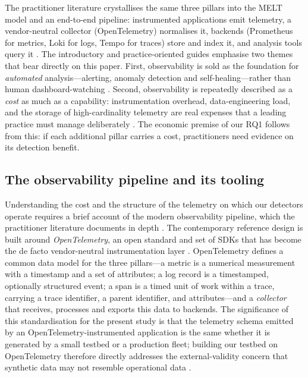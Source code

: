 \documentclass[acmsmall]{acmart}
\begin{document}
The practitioner literature crystallises the same three pillars into the MELT model and an end-to-end pipeline: instrumented applications emit telemetry, a vendor-neutral collector (OpenTelemetry) normalises it, backends (Prometheus for metrics, Loki for logs, Tempo for traces) store and index it, and analysis tools query it \cite{boten2022,chapman2023}. The introductory and practice-oriented guides emphasise two themes that bear directly on this paper. First, observability is sold as the foundation for \emph{automated} analysis---alerting, anomaly detection and self-healing---rather than human dashboard-watching \cite{beginnersobs,aws2022obs}. Second, observability is repeatedly described as a \emph{cost} as much as a capability: instrumentation overhead, data-engineering load, and the storage of high-cardinality telemetry are real expenses that a leading practice must manage deliberately \cite{leadingobs,kosinska2023}. The economic premise of our RQ1 follows from this: if each additional pillar carries a cost, practitioners need evidence on its detection benefit.

\subsection{The observability pipeline and its tooling}\label{sec:bg-tooling}

Understanding the cost and the structure of the telemetry on which our detectors operate requires a brief account of the modern observability pipeline, which the practitioner literature documents in depth \cite{boten2022,chapman2023,aws2022obs,beginnersobs}. The contemporary reference design is built around \emph{OpenTelemetry}, an open standard and set of SDKs that has become the de facto vendor-neutral instrumentation layer \cite{boten2022,opentelemetry2024spec}. OpenTelemetry defines a common data model for the three pillars---a metric is a numerical measurement with a timestamp and a set of attributes; a log record is a timestamped, optionally structured event; a span is a timed unit of work within a trace, carrying a trace identifier, a parent identifier, and attributes---and a \emph{collector} that receives, processes and exports this data to backends. The significance of this standardisation for the present study is that the telemetry schema emitted by an OpenTelemetry-instrumented application is the same whether it is generated by a small testbed or a production fleet; building our testbed on OpenTelemetry therefore directly addresses the external-validity concern that synthetic data may not resemble operational data \cite{hrusto2026}.
\end{document}
